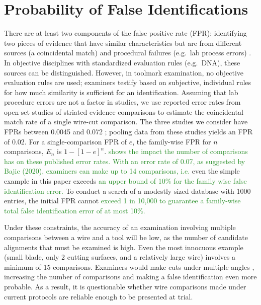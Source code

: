 \documentclass[9pt,twocolumn,twoside]{pnas-new}\usepackage[]{graphicx}\usepackage[dvipsnames]{xcolor}
\newcommand{\svp}[1]{{\textcolor{RedOrange}{#1}}}
\newcommand{\hh}[1]{{\textcolor{ForestGreen}{#1}}}
\begin{document}
\section*{Probability of False Identifications}
There are at least two components of the false positive rate (FPR): identifying two pieces of evidence that have similar characteristics but are from different sources (a coincidental match) and procedural failures (e.g.\ lab process errors) \citep[p 50]{pcast}.
In objective disciplines with standardized evaluation rules (e.g.\ DNA), these sources can be distinguished.
However, in toolmark examination, no objective evaluation rules are used; examiners testify based on subjective, individual rules for how much similarity is sufficient for an identification.
Assuming that lab procedure errors are not a factor in studies, we use reported error rates from open-set studies of striated evidence comparisons to estimate the coincidental match rate of a single wire-cut comparison.
The three studies we consider \citep{bajic2020, mattijssen2021,best2022} have FPRs between 0.0045 \citep{best2022} and 0.072 \citep{mattijssen2021}; pooling data from these studies yields an FPR of 0.02.
For a single-comparison FPR of $e$, the family-wise FPR for $n$ comparisons, $E_n$ is $1 - [1-e]^n$.
 \hh{shows the impact the number of comparisons has on these published error rates. With an error rate of 0.07, as suggested by Bajic (2020), examiners can make up to 14 comparisons, i.e.} \svp{even the simple example in this paper exceeds} \hh{an upper bound of 10\% for the family wise false identification error.}
\svp{To conduct a search of a modestly sized database with 1000 entries, the initial FPR cannot}
\hh{exceed 1 in 10,000 to guarantee a family-wise total false identification error of at most 10\%. }

Under these constraints, the accuracy of an examination involving multiple comparisons between a wire and a tool will be low, as the number of candidate alignments that must be examined is high.
Even the most innocuous example (small blade, only 2 cutting surfaces, and a relatively large wire) involves a minimum of 15 %
comparisons.
Examiners would make cuts under multiple angles \citep{baikerToolmarkVariabilityQuality2015}, increasing the number of comparisons \svp{and making a} false identification even more \svp{probable}.
As a result, it is questionable whether wire comparisons made under current protocols are reliable enough to be presented at trial.
\end{document}
